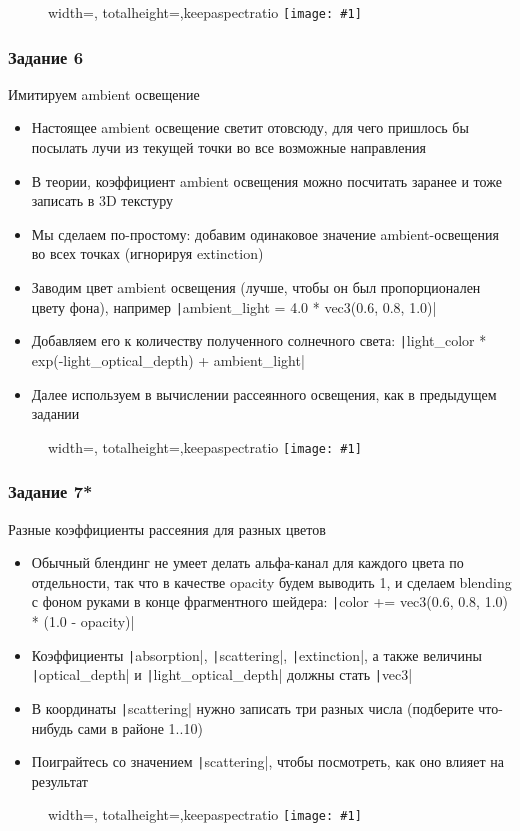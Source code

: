 \documentclass[10pt]{beamer}
\newcommand{\slideimage}[1]{
  \begin{figure}
    \begin{adjustbox}{width=\textwidth, totalheight=\textheight-2\baselineskip-2\baselineskip,keepaspectratio}
      \texttt{[image: \#1]}
    \end{adjustbox}
  \end{figure}
}
\begin{document}
\begin{frame}[fragile]
\slideimage{5.png}
\end{frame}

\begin{frame}[fragile]
\frametitle{Задание 6}
Имитируем ambient освещение
\begin{itemize}
\item Настоящее ambient освещение светит отовсюду, для чего пришлось бы посылать лучи из текущей точки во все возможные направления
\item В теории, коэффициент ambient освещения можно посчитать заранее и тоже записать в 3D текстуру
\item Мы сделаем по-простому: добавим одинаковое значение ambient-освещения во всех точках (игнорируя extinction)
\item Заводим цвет ambient освещения (лучше, чтобы он был пропорционален цвету фона), например \texttt|ambient_light = 4.0 * vec3(0.6, 0.8, 1.0)|
\item Добавляем его к количеству полученного солнечного света: \texttt|light_color * exp(-light_optical_depth) + ambient_light|
\item Далее используем в вычислении рассеянного освещения, как в предыдущем задании
\end{itemize}
\end{frame}

\begin{frame}[fragile]
\slideimage{6.png}
\end{frame}

\begin{frame}[fragile]
\frametitle{Задание 7*}
Разные коэффициенты рассеяния для разных цветов
\begin{itemize}
\item Обычный блендинг не умеет делать альфа-канал для каждого цвета по отдельности, так что в качестве opacity будем выводить 1, и сделаем blending с фоном руками в конце фрагментного шейдера: \texttt|color += vec3(0.6, 0.8, 1.0) * (1.0 - opacity)|
\item Коэффициенты \texttt|absorption|, \texttt|scattering|, \texttt|extinction|, а также величины \texttt|optical_depth| и \texttt|light_optical_depth| должны стать \texttt|vec3|
\item В координаты \texttt|scattering| нужно записать три разных числа (подберите что-нибудь сами в районе 1..10)
\item Поиграйтесь со значением \texttt|scattering|, чтобы посмотреть, как оно влияет на результат
\end{itemize}
\end{frame}

\begin{frame}[fragile]
\slideimage{7.png}
\end{frame}
\end{document}
